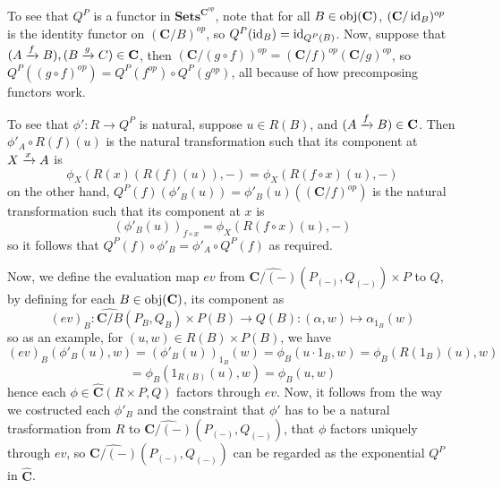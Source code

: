 To see that $Q^P$ is a functor in $\mathbf{Sets}^{\mathbf{C}^{op}}$, note that for all $B\in\operatorname{\operatorname{obj}}(\mathbf{C})$, $(\mathbf{C}/\operatorname{\operatorname{id}}_B)^{op}$ is the identity functor on $(\mathbf{C}/B)^{op}$, so $Q^P(\operatorname{\operatorname{id}}_B)=\operatorname{\operatorname{id}}_{Q^P(B)}$. Now, suppose that $(A\xrightarrow{f}B),(B\xrightarrow{g}C)\in\mathbf{C}$, then $(\mathbf{C}/(g\circ f))^{op}=(\mathbf{C}/f)^{op}(\mathbf{C}/g)^{op}$, so $Q^P((g\circ f)^{op})=Q^P(f^{op})\circ Q^P(g^{op})$, all because of how precomposing functors work.

To see that $\phi':R\to Q^P$ is natural, suppose $u\in R(B)$, and $(A\xrightarrow{f}B)\in\mathbf{C}$. Then $\phi'_A\circ R(f)(u)$ is the natural transformation such that its component at $X\xrightarrow{x}A$ is
\[\phi_X(R(x)(R(f)(u)),-)=\phi_X(R(f\circ x)(u),-)\]
on the other hand, $Q^P(f)(\phi'_B(u))=\phi'_B(u)((\mathbf{C}/f)^{op})$ is the natural transformation such that its component at $x$ is
\[(\phi'_B(u))_{f\circ x}=\phi_X(R(f\circ x)(u),-)\]
so it follows that $Q^P(f)\circ\phi'_B=\phi'_A\circ Q^P(f)$ as required.

Now, we define the evaluation map $ev$ from $\widehat{\mathbf{C}/(-)}(P_{(-)},Q_{(-)})\times P$ to $Q$, by defining for each $B\in\operatorname{\operatorname{obj}}(\mathbf{C})$, its component as
\[(ev)_B:\widehat{\mathbf{C}/B}(P_B,Q_B)\times P(B)\to Q(B):(\alpha,w)\mapsto\alpha_{1_B}(w)\]
so as an example, for $(u,w)\in R(B)\times P(B)$, we have
\[(ev)_B(\phi'_B(u),w)=(\phi'_B(u))_{1_B}(w)=\phi_B(u\cdot1_B,w)=\phi_B(R(1_B)(u),w)\]
\[=\phi_B(1_{R(B)}(u),w)=\phi_B(u,w)\]
hence each $\phi\in\widehat{\mathbf{C}}(R\times P,Q)$ factors through $ev$. Now, it follows from the way we costructed each $\phi'_B$ and the constraint that $\phi'$ has to be a natural trasformation from $R$ to $\widehat{\mathbf{C}/(-)}(P_{(-)},Q_{(-)})$, that $\phi$ factors uniquely through $ev$, so $\widehat{\mathbf{C}/(-)}(P_{(-)},Q_{(-)})$ can be regarded as the exponential $Q^P$ in $\widehat{\mathbf{C}}$.